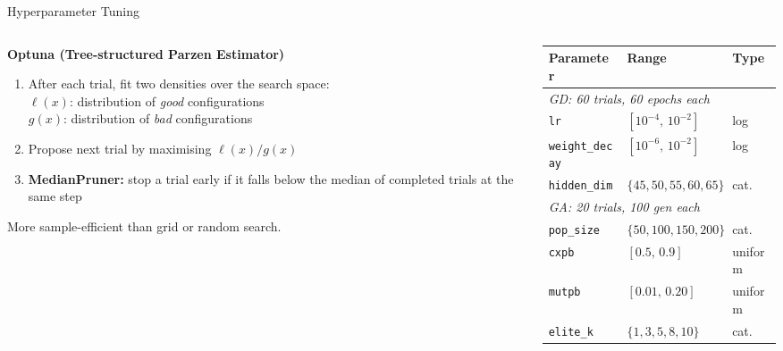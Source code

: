 \documentclass[aspectratio=169,10pt]{beamer}
\begin{document}
\begin{frame}{Hyperparameter Tuning}
  \begin{columns}[T]
    \begin{column}{0.50\textwidth}
      \textbf{Optuna (Tree-structured Parzen Estimator)}
      \begin{enumerate}\small
        \item After each trial, fit two densities over the search space:\\[2pt]
          $\ell(x)$: distribution of \emph{good} configurations\\
          $g(x)$: distribution of \emph{bad} configurations
        \item Propose next trial by maximising $\ell(x)/g(x)$
        \item \textbf{MedianPruner:} stop a trial early if it falls below the median of completed trials at the same step
      \end{enumerate}
      \vspace{0.3em}
      More sample-efficient than grid or random search.
    \end{column}
    \begin{column}{0.46\textwidth}
      \small
      \begin{tabular}{lll}
        \toprule
        Parameter & Range & Type \\
        \midrule
        \multicolumn{3}{l}{\textit{GD: 60 trials, 60 epochs each}} \\
        \texttt{lr} & $[10^{-4},\,10^{-2}]$ & log \\
        \texttt{weight\_decay} & $[10^{-6},\,10^{-2}]$ & log \\
        \texttt{hidden\_dim} & $\{45,50,55,60,65\}$ & cat. \\
        \midrule
        \multicolumn{3}{l}{\textit{GA: 20 trials, 100 gen each}} \\
        \texttt{pop\_size} & $\{50,100,150,200\}$ & cat. \\
        \texttt{cxpb} & $[0.5,\,0.9]$ & uniform \\
        \texttt{mutpb} & $[0.01,\,0.20]$ & uniform \\
        \texttt{elite\_k} & $\{1,3,5,8,10\}$ & cat. \\
        \bottomrule
      \end{tabular}
    \end{column}
  \end{columns}
\end{frame}
\end{document}
